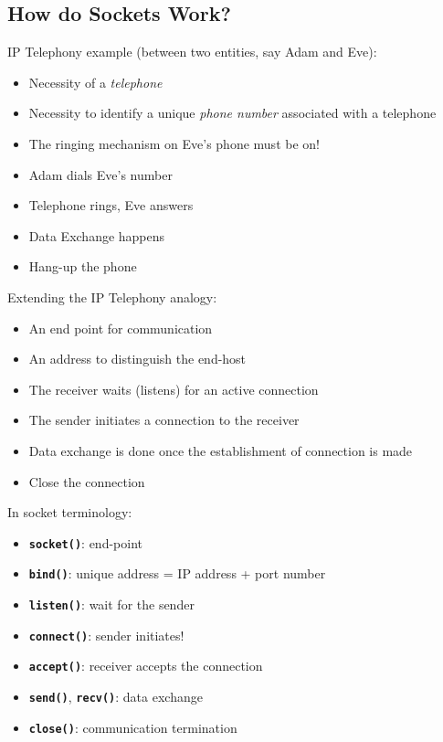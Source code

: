 \documentclass[10pt]{article}
\begin{document}
\subsection{How do Sockets Work?}
IP Telephony example (between two entities, say Adam and Eve):
\begin{itemize}
\item Necessity of a \textit{telephone}
\item Necessity to identify a unique \textit{phone number} associated with a telephone
\item The ringing mechanism on Eve's phone must be on!
\item Adam dials Eve's number
\item Telephone rings, Eve answers
\item Data Exchange happens
\item Hang-up the phone
\end{itemize}
\vspace{5mm}
Extending the IP Telephony analogy:
\begin{itemize}
\item An end point for communication
\item An address to distinguish the end-host
\item The receiver waits (listens) for an active connection
\item The sender initiates a connection to the receiver
\item Data exchange is done once the establishment of connection is made
\item Close the connection
\end{itemize}
\vspace{5mm}
In socket terminology:
\begin{itemize}
\item \textbf{\texttt{socket()}}: end-point
\item \textbf{\texttt{bind()}}: unique address = IP address + port number
\item \textbf{\texttt{listen()}}: wait for the sender
\item \textbf{\texttt{connect()}}: sender initiates!
\item \textbf{\texttt{accept()}}: receiver accepts the connection
\item \textbf{\texttt{send()}}, \textbf{\texttt{recv()}}: data exchange
\item \textbf{\texttt{close()}}: communication termination
\end{itemize}
\end{document}
